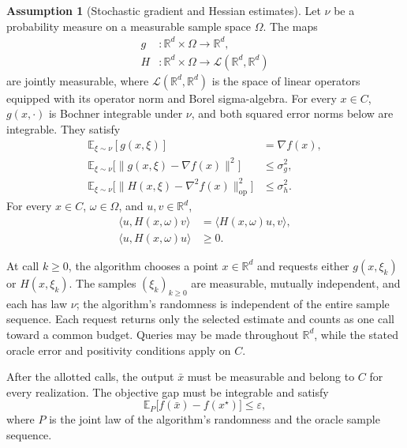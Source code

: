 \documentclass[10pt]{article}
\theoremstyle{definition}
\newtheorem{assumption}{Assumption}
\begin{document}
\begin{assumption}[Stochastic gradient and Hessian estimates]
Let $\nu$ be a probability measure on a measurable sample space $\Omega$. The maps
\[
\begin{aligned}
g&:\mathbb{R}^d\times\Omega\to\mathbb{R}^d,\\
H&:\mathbb{R}^d\times\Omega\to\mathcal{L}(\mathbb{R}^d,\mathbb{R}^d)
\end{aligned}
\]
are jointly measurable, where $\mathcal{L}(\mathbb{R}^d,\mathbb{R}^d)$ is the space of linear operators equipped with its operator norm and Borel sigma-algebra. For every $x\in C$, $g(x,\cdot)$ is Bochner integrable under $\nu$, and both squared error norms below are integrable. They satisfy
\[
\begin{aligned}
\mathbb{E}_{\xi\sim\nu}[g(x,\xi)]&=\nabla f(x),\\
\mathbb{E}_{\xi\sim\nu}\bigl[\|g(x,\xi)-\nabla f(x)\|^2\bigr]
&\leq\sigma_g^2,\\
\mathbb{E}_{\xi\sim\nu}\bigl[\|H(x,\xi)-\nabla^2 f(x)\|_{\mathrm{op}}^2\bigr]
&\leq\sigma_h^2.
\end{aligned}
\]
For every $x\in C$, $\omega\in\Omega$, and $u,v\in\mathbb{R}^d$,
\[
\begin{aligned}
\langle u,H(x,\omega)v\rangle
&=\langle H(x,\omega)u,v\rangle,\\
\langle u,H(x,\omega)u\rangle&\geq0.
\end{aligned}
\]
\end{assumption}

At call $k\geq0$, the algorithm chooses a point $x\in\mathbb{R}^d$ and requests either $g(x,\xi_k)$ or $H(x,\xi_k)$. The samples $(\xi_k)_{k\geq0}$ are measurable, mutually independent, and each has law $\nu$; the algorithm's randomness is independent of the entire sample sequence. Each request returns only the selected estimate and counts as one call toward a common budget. Queries may be made throughout $\mathbb{R}^d$, while the stated oracle error and positivity conditions apply on $C$.

After the allotted calls, the output $\bar{x}$ must be measurable and belong to $C$ for every realization. The objective gap must be integrable and satisfy
\[
\mathbb{E}_{P}\bigl[f(\bar{x})-f(x^\star)\bigr]\leq\varepsilon,
\]
where $P$ is the joint law of the algorithm's randomness and the oracle sample sequence.
\end{document}
